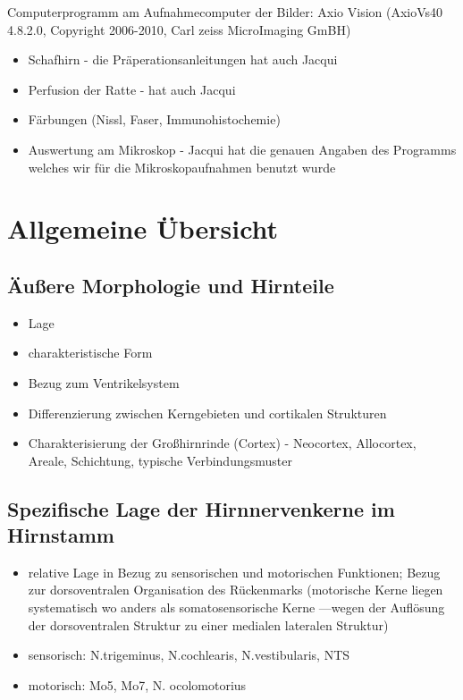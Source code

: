 \documentclass[12pt,a4paper,pdftex]{article}
\begin{document}
Computerprogramm am Aufnahmecomputer der Bilder:
Axio Vision (AxioVs40 4.8.2.0, Copyright 2006-2010, Carl zeiss MicroImaging GmBH)



\begin{itemize}
    \item Schafhirn - die Präperationsanleitungen hat auch Jacqui
    \item Perfusion der Ratte - hat auch Jacqui
    \item Färbungen (Nissl, Faser, Immunohistochemie)
    \item Auswertung am Mikroskop - Jacqui hat die genauen Angaben des Programms welches wir für die Mikroskopaufnahmen benutzt wurde
\end{itemize}

\newpage
\section{Allgemeine Übersicht}
\subsection{Äußere Morphologie und Hirnteile}

\begin{itemize}
    \item Lage
    \item charakteristische Form
    \item Bezug zum Ventrikelsystem
    \item Differenzierung zwischen Kerngebieten und cortikalen Strukturen
    \item Charakterisierung der Großhirnrinde (Cortex) - Neocortex, Allocortex, Areale, Schichtung, typische Verbindungsmuster
\end{itemize}
\subsection{Spezifische Lage der Hirnnervenkerne im Hirnstamm}
\begin{itemize}
    \item relative Lage in Bezug zu sensorischen und motorischen Funktionen; Bezug zur dorsoventralen Organisation des Rückenmarks  
    (motorische Kerne liegen systematisch  wo anders als somatosensorische Kerne ---wegen der Auflösung der dorsoventralen Struktur zu einer medialen lateralen Struktur) 
    \item sensorisch: N.trigeminus, N.cochlearis, N.vestibularis, NTS
    \item motorisch: Mo5, Mo7, N. ocolomotorius
\end{itemize}
\end{document}
